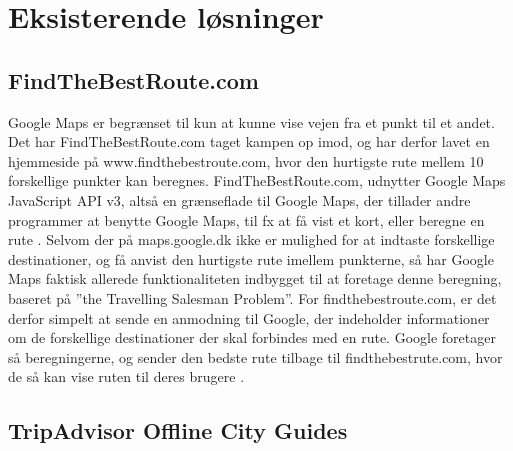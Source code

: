 \section{Eksisterende løsninger}
\subsection{FindTheBestRoute.com}
Google Maps er begrænset til kun at kunne vise vejen fra et punkt til et andet. Det har FindTheBestRoute.com taget kampen op imod, og har derfor lavet en hjemmeside på www.findthebestroute.com, hvor den hurtigste rute mellem 10 forskellige punkter kan beregnes. FindTheBestRoute.com, udnytter Google Maps JavaScript API v3, altså en grænseflade til Google Maps, der tillader andre programmer at benytte Google Maps, til fx at få vist et kort, eller beregne en rute \citep{ftbr}.\newline
Selvom der på maps.google.dk ikke er mulighed for at indtaste forskellige destinationer, og få anvist den hurtigste rute imellem punkterne, så har Google Maps faktisk allerede funktionaliteten indbygget til at foretage denne beregning, baseret på ”the Travelling Salesman Problem”.\newline
For findthebestroute.com, er det derfor simpelt at sende en anmodning til Google, der indeholder informationer om de forskellige destinationer der skal forbindes med en rute. Google foretager så beregningerne, og sender den bedste rute tilbage til findthebestrute.com, hvor de så kan vise ruten til deres brugere \citep{googleapi}.

\subsection{TripAdvisor Offline City Guides}

